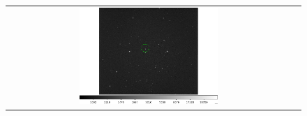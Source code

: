 \documentclass[letterpaper,12pt]{article}
\begin{document}
\begin{figure}[h!]
\begin{tabular}{cc}
                                                                                                                                                                                                                                                                                                                                                                                                                                                                                                                                                                                                                                                                                                                                                                                \includegraphics[width=0.5\textwidth]{asteroid_19.png} &

\end{tabular}
\end{figure}
\end{document}
